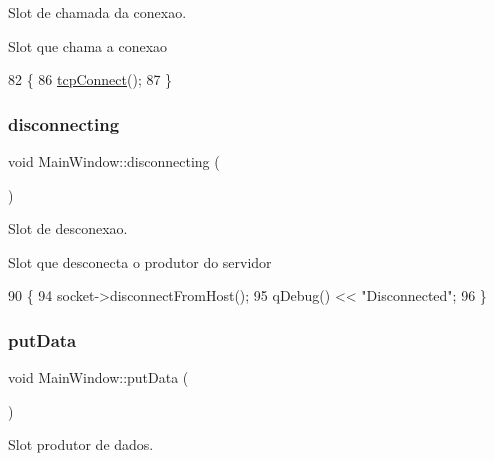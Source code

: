 Slot de chamada da conexao. 

Slot que chama a conexao
\begin{DoxyCode}
82                            \{
86     \hyperlink{class_main_window_ac5b669957c442b6eb68573dacfce33e1}{tcpConnect}();
87 \}
\end{DoxyCode}
\mbox{\label{class_main_window_a496a126baa8c2a0a7d0bdab86c128f98}} 
\subsubsection{\texorpdfstring{disconnecting}{disconnecting}}
{\footnotesize\ttfamily void Main\+Window\+::disconnecting (\begin{DoxyParamCaption}{ }\end{DoxyParamCaption})\hspace{0.3cm}{\ttfamily [slot]}}



Slot de desconexao. 

Slot que desconecta o produtor do servidor
\begin{DoxyCode}
90                               \{
94     socket->disconnectFromHost();
95     qDebug() << \textcolor{stringliteral}{"Disconnected"};
96 \}
\end{DoxyCode}
\mbox{\label{class_main_window_afdfeb13ec363b0eb8ecacaf0aa13b605}} 
\subsubsection{\texorpdfstring{put\+Data}{putData}}
{\footnotesize\ttfamily void Main\+Window\+::put\+Data (\begin{DoxyParamCaption}{ }\end{DoxyParamCaption})\hspace{0.3cm}{\ttfamily [slot]}}



Slot produtor de dados. 

